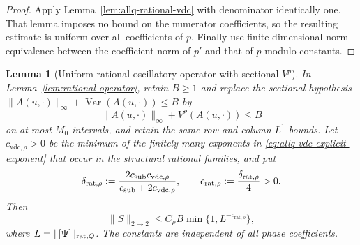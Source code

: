 \documentclass[11pt]{article}
\numberwithin{equation}{section}
\newtheorem{lemma}[theorem]{Lemma}
\theoremstyle{remark}
\theoremstyle{definition}
\begin{document}
\begin{proof}
Apply Lemma~\ref{lem:allq-rational-vdc} with denominator identically one.
That lemma imposes no bound on the numerator coefficients, so the resulting
estimate is uniform over all coefficients of $p$.  Finally use
finite-dimensional norm equivalence between the coefficient norm of $p'$
and that of $p$ modulo constants.
\end{proof}

\begin{lemma}[Uniform rational oscillatory operator with sectional $V^\rho$]
\label{lem:allq-rational-operator}
In Lemma~\ref{lem:rational-operator}, retain $B\ge1$ and replace the sectional hypothesis
$\|A(u,\cdot)\|_\infty+\operatorname{Var}(A(u,\cdot))\le B$ by
\[
 \|A(u,\cdot)\|_\infty+V^\rho(A(u,\cdot))\le B
\]
on at most $M_0$ intervals, and retain the same row and column $L^1$
bounds. Let $c_{\mathrm{vdc},\rho}>0$ be the minimum of the finitely many
exponents in \eqref{eq:allq-vdc-explicit-exponent} that occur in the
structural rational families, and put
\begin{equation}\label{eq:allq-rational-operator-exponent}
 \delta_{\mathrm{rat},\rho}
 :=\frac{2c_{\rm sub}c_{\mathrm{vdc},\rho}}
         {c_{\rm sub}+2c_{\mathrm{vdc},\rho}},
 \qquad
 c_{\mathrm{rat},\rho}:=\frac{\delta_{\mathrm{rat},\rho}}4>0.
\end{equation}
Then
\begin{equation}\label{eq:allq-rational-operator}
 \|S\|_{2\to2}
 \le C_\rho B
       \min\{1,L^{-c_{\mathrm{rat},\rho}}\},
\end{equation}
where $L=\|[\Psi]\|_{{\rm rat},Q}$. The constants are independent of all
phase coefficients.
\end{lemma}
\end{document}
